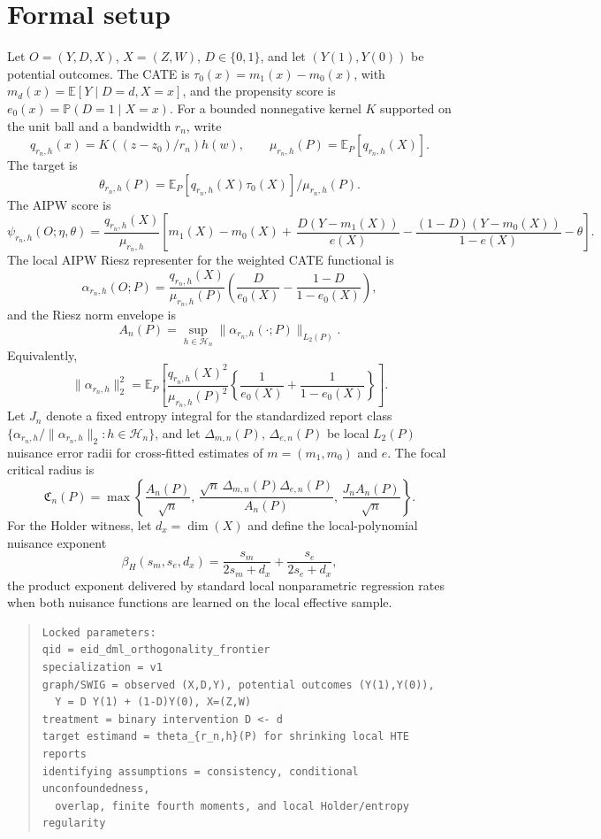 \documentclass[11pt]{article}
\newcommand{\E}{\mathbb{E}}
\renewcommand{\Pr}{\mathbb{P}}
\newcommand{\calH}{\mathcal{H}}
\theoremstyle{definition}
\theoremstyle{plain}
\theoremstyle{remark}
\begin{document}
\section{Formal setup}
Let \(O=(Y,D,X)\), \(X=(Z,W)\), \(D\in\{0,1\}\), and let
\((Y(1),Y(0))\) be potential outcomes.  The CATE is
\(\tau_0(x)=m_1(x)-m_0(x)\), with \(m_d(x)=\E[Y\mid D=d,X=x]\), and the
propensity score is \(e_0(x)=\Pr(D=1\mid X=x)\).  For a bounded nonnegative
kernel \(K\) supported on the unit ball and a bandwidth \(r_n\), write
\[
q_{r_n,h}(x)=K((z-z_0)/r_n)h(w),\qquad
\mu_{r_n,h}(P)=\E_P[q_{r_n,h}(X)].
\]
The target is
\[
\theta_{r_n,h}(P)=\E_P[q_{r_n,h}(X)\tau_0(X)]/\mu_{r_n,h}(P).
\]
The AIPW score is
\[
\psi_{r_n,h}(O;\eta,\theta)=
\frac{q_{r_n,h}(X)}{\mu_{r_n,h}}
\left[
m_1(X)-m_0(X)
+\,
\frac{D(Y-m_1(X))}{e(X)}
-\frac{(1-D)(Y-m_0(X))}{1-e(X)}
-\theta
\right].
\]
The local AIPW Riesz representer for the weighted CATE functional is
\[
\alpha_{r_n,h}(O;P)=
\frac{q_{r_n,h}(X)}{\mu_{r_n,h}(P)}
\left(\frac{D}{e_0(X)}-\frac{1-D}{1-e_0(X)}\right),
\]
and the Riesz norm envelope is
\[
A_n(P)=\sup_{h\in\calH_n}\|\alpha_{r_n,h}(\cdot;P)\|_{L_2(P)}.
\]
Equivalently,
\[
\|\alpha_{r_n,h}\|_2^2=
\E_P\left[
\frac{q_{r_n,h}(X)^2}{\mu_{r_n,h}(P)^2}
\left\{\frac{1}{e_0(X)}+\frac{1}{1-e_0(X)}\right\}
\right].
\]
Let \(J_n\) denote a fixed entropy integral for the standardized report class
\(\{\alpha_{r_n,h}/\|\alpha_{r_n,h}\|_2:h\in\calH_n\}\), and let
\(\Delta_{m,n}(P)\), \(\Delta_{e,n}(P)\) be local \(L_2(P)\) nuisance error
radii for cross-fitted estimates of \(m=(m_1,m_0)\) and \(e\).  The focal
critical radius is
\[
\mathfrak C_n(P)=
\max\left\{
\frac{A_n(P)}{\sqrt n},\,
\frac{\sqrt n\,\Delta_{m,n}(P)\Delta_{e,n}(P)}{A_n(P)},\,
\frac{J_nA_n(P)}{\sqrt n}
\right\}.
\]
For the Holder witness, let \(d_x=\dim(X)\) and define the local-polynomial
nuisance exponent
\[
\beta_H(s_m,s_e,d_x)=\frac{s_m}{2s_m+d_x}+\frac{s_e}{2s_e+d_x},
\]
the product exponent delivered by standard local nonparametric regression
rates when both nuisance functions are learned on the local effective sample.

\begin{quote}
\begin{verbatim}
Locked parameters:
qid = eid_dml_orthogonality_frontier
specialization = v1
graph/SWIG = observed (X,D,Y), potential outcomes (Y(1),Y(0)),
  Y = D Y(1) + (1-D)Y(0), X=(Z,W)
treatment = binary intervention D <- d
target estimand = theta_{r_n,h}(P) for shrinking local HTE reports
identifying assumptions = consistency, conditional unconfoundedness,
  overlap, finite fourth moments, and local Holder/entropy regularity
\end{verbatim}
\end{quote}
\end{document}

